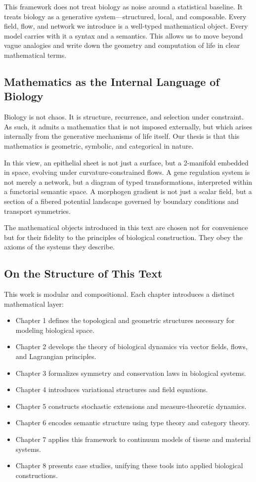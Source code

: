 This framework does not treat biology as noise around a statistical baseline. It treats biology as a generative system—structured, local, and composable. Every field, flow, and network we introduce is a well-typed mathematical object. Every model carries with it a syntax and a semantics. This allows us to move beyond vague analogies and write down the geometry and computation of life in clear mathematical terms.

\subsection{Mathematics as the Internal Language of Biology}

Biology is not chaos. It is structure, recurrence, and selection under constraint. As such, it admits a mathematics that is not imposed externally, but which arises internally from the generative mechanisms of life itself. Our thesis is that this mathematics is geometric, symbolic, and categorical in nature.

In this view, an epithelial sheet is not just a surface, but a 2-manifold embedded in space, evolving under curvature-constrained flows. A gene regulation system is not merely a network, but a diagram of typed transformations, interpreted within a functorial semantic space. A morphogen gradient is not just a scalar field, but a section of a fibered potential landscape governed by boundary conditions and transport symmetries.

The mathematical objects introduced in this text are chosen not for convenience but for their fidelity to the principles of biological construction. They obey the axioms of the systems they describe.

\subsection{On the Structure of This Text}

This work is modular and compositional. Each chapter introduces a distinct mathematical layer:
\begin{itemize}
  \item Chapter 1 defines the topological and geometric structures necessary for modeling biological space.
  \item Chapter 2 develops the theory of biological dynamics via vector fields, flows, and Lagrangian principles.
  \item Chapter 3 formalizes symmetry and conservation laws in biological systems.
  \item Chapter 4 introduces variational structures and field equations.
  \item Chapter 5 constructs stochastic extensions and measure-theoretic dynamics.
  \item Chapter 6 encodes semantic structure using type theory and category theory.
  \item Chapter 7 applies this framework to continuum models of tissue and material systems.
  \item Chapter 8 presents case studies, unifying these tools into applied biological constructions.
\end{itemize}

